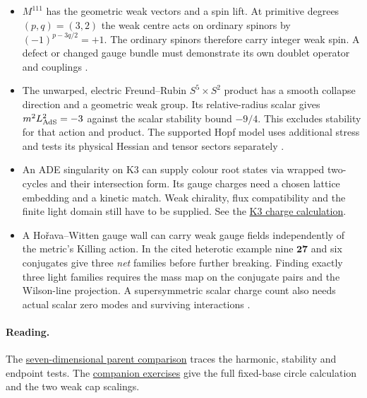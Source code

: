 \documentclass[10pt]{article}
\theoremstyle{definition}
\begin{document}
\begin{itemize}
\item \(M^{111}\) has the geometric weak vectors and a spin lift. At primitive degrees \((p,q)=(3,2)\) the weak centre acts on ordinary spinors by \((-1)^{p-3q/2}=+1\). The ordinary spinors therefore carry integer weak spin. A defect or changed gauge bundle must demonstrate its own doublet operator and couplings \cite{Witten1981,Fabbri1999,SevenMTheory2026}.
\item The unwarped, electric Freund--Rubin \(S^5\times S^2\) product has a smooth collapse direction and a geometric weak group. Its relative-radius scalar gives \(m^2L_{\rm AdS}^2=-3\) against the scalar stability bound \(-9/4\). This excludes stability for that action and product. The supported Hopf model uses additional stress and tests its physical Hessian and tensor sectors separately \cite{FreundRubin1980,BF1982,SevenMTheory2026}.
\item An ADE singularity on K3 can supply colour root states via wrapped two-cycles and their intersection form. Its gauge charges need a chosen lattice embedding and a kinetic match. Weak chirality, flux compatibility and the finite light domain still have to be supplied. See the \href{https://github.com/arivero/conneskk/blob/master/results/88_k3_colour_hypercharge_and_instanton_action.md}{K3 charge calculation}.
\item A Ho\v{r}ava--Witten gauge wall can carry weak gauge fields independently of the metric's Killing action. In the cited heterotic example nine \(\mathbf{27}\) and six conjugates give three \emph{net} families before further breaking. Finding exactly three light families requires the mass map on the conjugate pairs and the Wilson-line projection. A supersymmetric scalar charge count also needs actual scalar zero modes and surviving interactions \cite{HW1996,CHSW1985,SevenMTheory2026}.
\end{itemize}

\paragraph{Reading.} The \href{https://github.com/arivero/conneskk/blob/master/paper/seven_m_theory.tex}{seven-dimensional parent comparison} traces the harmonic, stability and endpoint tests. The \href{https://github.com/arivero/conneskk/blob/master/paper/kk_strings_lecture.tex}{companion exercises} give the full fixed-base circle calculation and the two weak cap scalings.
\end{document}
